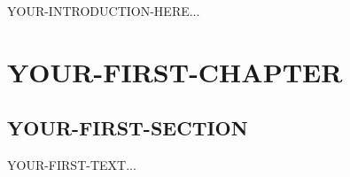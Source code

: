 \documentclass[10pt]{book}
\begin{document}
\thispagestyle{firstpage}
\maketitlepage

YOUR-INTRODUCTION-HERE...

\newpage
\tableofcontents
\newpage

\chapter{YOUR-FIRST-CHAPTER}

\section{YOUR-FIRST-SECTION}

YOUR-FIRST-TEXT...

\appendix
\end{document}
